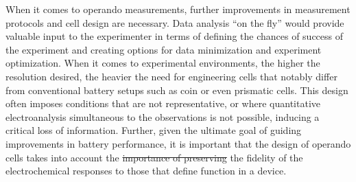 \documentclass[journal=cmatex,manuscript=perspective]{achemso}
\providecommand{\DIFaddtex}[1]{{\protect\color{blue}\uwave{#1}}} %
\providecommand{\DIFdeltex}[1]{{\protect\color{red}\sout{#1}}}                      %
\providecommand{\DIFaddbegin}{} %
\providecommand{\DIFaddend}{} %
\providecommand{\DIFdelbegin}{} %
\providecommand{\DIFdelend}{} %
\providecommand{\DIFadd}[1]{\texorpdfstring{\DIFaddtex{#1}}{#1}} %
\providecommand{\DIFdel}[1]{\texorpdfstring{\DIFdeltex{#1}}{}} %
\begin{document}
When it comes to operando measurements, further improvements in
measurement protocols and cell design are necessary. Data analysis ``on
the fly'' would provide valuable input to the experimenter in terms of
defining the chances of success of the experiment and creating options
for data minimization and experiment optimization. When it comes to
experimental environments, the higher the resolution desired, the
heavier the need for engineering cells that notably differ from
conventional battery setups such as coin or even prismatic cells. This
design often imposes conditions that are not representative, or where
quantitative electroanalysis simultaneous to the observations is not
possible, inducing a critical loss of information. Further, given the
ultimate goal of guiding improvements in battery performance, it is
important that the design of operando cells takes into account the
\DIFdelbegin \DIFdel{importance of preserving }\DIFdelend \DIFaddbegin \DIFadd{need to preserve }\DIFaddend the fidelity of the electrochemical responses
to those that define function in a device.
\end{document}
